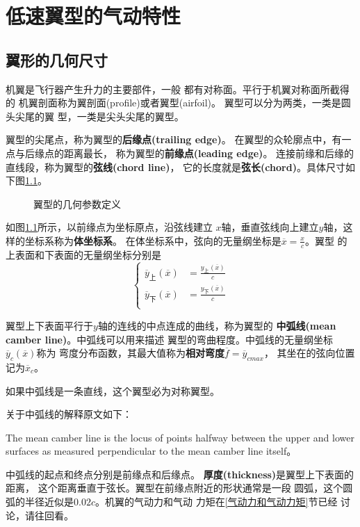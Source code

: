 
\chapter{低速翼型的气动特性}
\section{翼形的几何尺寸}
机翼是飞行器产生升力的主要部件，一般
都有对称面。平行于机翼对称面所截得的
机翼剖面称为翼剖面(profile)或者翼型(airfoil)。
翼型可以分为两类，一类是圆头尖尾的翼
型，一类是尖头尖尾的翼型。

翼型的尖尾点，称为翼型的{\bfseries 后缘点(trailing edge)}。
在翼型的众轮廓点中，有一点与后缘点的距离最长，
称为翼型的{\bfseries 前缘点(leading edge)}。
连接前缘和后缘的直线段，称为翼型的{\bfseries 弦线(chord line)}，
它的长度就是{\bfseries 弦长(chord)}。具体尺寸如下图\ref{fig:profile}。
\begin{figure}[!ht]
	\center
	
	\caption{翼型的几何参数定义}
	\label{fig:profile}
\end{figure}
如图\ref{fig:profile}所示，以前缘点为坐标原点，沿弦线建立
$x$轴，垂直弦线向上建立$y$轴，这样的坐标系称为{\bfseries 体坐标系}。
在体坐标系中，弦向的无量纲坐标是$\overline{x}=\frac{x}{c}$。翼型
的上表面和下表面的无量纲坐标分别是
\begin{equation*}
	\begin{cases}
		\overline{y}_上(\overline{x}) & =\frac{y_上(\overline{x})}{c} \\
		\overline{y}_下(\overline{x}) & =\frac{y_下(\overline{x})}{c} \\
	\end{cases}
\end{equation*}

翼型上下表面平行于$y$轴的连线的中点连成的曲线，称为翼型的
{\bfseries 中弧线(mean camber line)}。中弧线可以用来描述
翼型的弯曲程度。中弧线的无量纲坐标$\overline{y}_c(\overline{x})$称为
弯度分布函数，其最大值称为{\bfseries 相对弯度}$\overline{f}=\overline{y}_{cmax}$，
其坐在的弦向位置记为$\overline{x}_c$。
\begin{note}
	如果中弧线是一条直线，这个翼型必为对称翼型。
\end{note}
\begin{notice}
	关于中弧线的解释原文如下：

	The mean camber line is the
	locus of points halfway between the upper and lower surfaces as measured perpendicular
	to the mean camber line itself。
\end{notice}
中弧线的起点和终点分别是前缘点和后缘点。
{\bfseries 厚度(thickness)}是翼型上下表面的距离，
这个距离垂直于弦长。翼型在前缘点附近的形状通常是一段
圆弧，这个圆弧的半径近似是$0.02c$。机翼的气动力和气动
力矩在{\color{titleblue}\ref{气动力和气动力矩}}节已经
讨论，请往回看。

